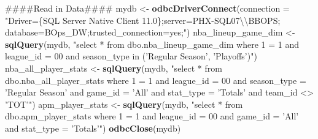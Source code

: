 \documentclass[]{article}
\newenvironment{Shaded}{\begin{snugshade}}{\end{snugshade}}
\newcommand{\KeywordTok}[1]{\textcolor[rgb]{0.13,0.29,0.53}{\textbf{#1}}}
\newcommand{\DataTypeTok}[1]{\textcolor[rgb]{0.13,0.29,0.53}{#1}}
\newcommand{\CharTok}[1]{\textcolor[rgb]{0.31,0.60,0.02}{#1}}
\newcommand{\StringTok}[1]{\textcolor[rgb]{0.31,0.60,0.02}{#1}}
\newcommand{\NormalTok}[1]{#1}
\begin{document}
\begin{Shaded}
\begin{Highlighting}[]
\NormalTok{####Read in Data####}
\NormalTok{mydb <-}\StringTok{ }\KeywordTok{odbcDriverConnect}\NormalTok{(}\DataTypeTok{connection =} \StringTok{"Driver=\{SQL Server Native Client 11.0\};server=PHX-SQL07}\CharTok{\textbackslash{}\textbackslash{}}\StringTok{BBOPS; database=BOps_DW;trusted_connection=yes;"}\NormalTok{)}
\NormalTok{nba_lineup_game_dim <-}\StringTok{ }\KeywordTok{sqlQuery}\NormalTok{(mydb, }\StringTok{"select * from dbo.nba_lineup_game_dim}
\StringTok{                                            where 1 = 1}
\StringTok{                                            and league_id = 00}
\StringTok{                                            and season_type in ('Regular Season', 'Playoffs')"}\NormalTok{)}
\NormalTok{nba_all_player_stats <-}\StringTok{ }\KeywordTok{sqlQuery}\NormalTok{(mydb, }\StringTok{"select * from dbo.nba_all_player_stats}
\StringTok{                                            where 1 = 1}
\StringTok{                                            and league_id = 00}
\StringTok{                                            and season_type = 'Regular Season'}
\StringTok{                                                                and game_id = 'All'}
\StringTok{                                                                and stat_type = 'Totals'}
\StringTok{                                          and team_id <> 'TOT'"}\NormalTok{)}
\NormalTok{apm_player_stats <-}\StringTok{ }\KeywordTok{sqlQuery}\NormalTok{(mydb, }\StringTok{"select * from dbo.apm_player_stats}
\StringTok{                                          where 1 = 1}
\StringTok{                                          and league_id = 00}
\StringTok{                                          and game_id = 'All'}
\StringTok{                                          and stat_type = 'Totals'"}\NormalTok{)}
\KeywordTok{odbcClose}\NormalTok{(mydb)}



\end{Highlighting}
\end{Shaded}
\end{document}
